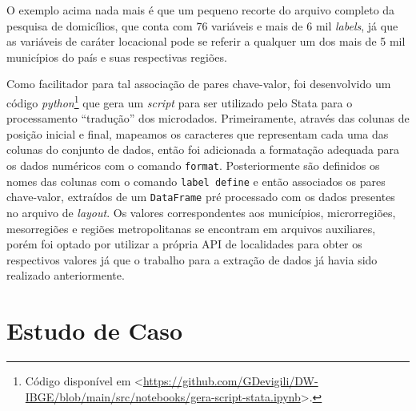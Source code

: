     O exemplo acima nada mais é que um pequeno recorte do arquivo completo da pesquisa de domicílios, que conta com 76 variáveis e mais de 6 mil \textit{labels}, já que as variáveis de caráter locacional pode se referir a qualquer um dos mais de 5 mil municípios do país e suas respectivas regiões. 
    
    Como facilitador para tal associação de pares chave-valor, foi desenvolvido um código \textit{python}\footnote{Código disponível em <\url{https://github.com/GDevigili/DW-IBGE/blob/main/src/notebooks/gera-script-stata.ipynb}>.} que gera um \textit{script} para ser utilizado pelo Stata para o processamento  ``tradução'' dos microdados. 
    Primeiramente, através das colunas de posição inicial e final, mapeamos os caracteres que representam cada uma das colunas do conjunto de dados, então foi adicionada a formatação adequada para os dados numéricos com o comando \verb|format|. Posteriormente são definidos os nomes das colunas com o comando \verb|label define| e então associados os pares chave-valor, extraídos de um \verb|DataFrame| pré processado com os dados presentes no arquivo de \textit{layout}. Os valores correspondentes aos municípios, microrregiões, mesorregiões e regiões metropolitanas se encontram em arquivos auxiliares, porém foi optado por utilizar a própria API de localidades para obter os respectivos valores já que o trabalho para a extração de dados já havia sido realizado anteriormente.


\chapter{Estudo de Caso}